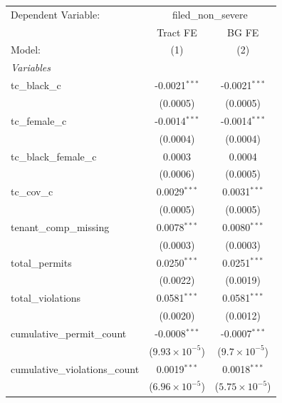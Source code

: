 \begin{tabular}{lcc}
   \tabularnewline \midrule \midrule
   Dependent Variable: & \multicolumn{2}{c}{filed\_non\_severe}\\
                                   & Tract FE                & BG FE \\   
   Model:                          & (1)                     & (2)\\  
   \midrule
   \emph{Variables}\\
   tc\_black\_c                    & -0.0021$^{***}$         & -0.0021$^{***}$\\   
                                   & (0.0005)                & (0.0005)\\   
   tc\_female\_c                   & -0.0014$^{***}$         & -0.0014$^{***}$\\   
                                   & (0.0004)                & (0.0004)\\   
   tc\_black\_female\_c            & 0.0003                  & 0.0004\\   
                                   & (0.0006)                & (0.0005)\\   
   tc\_cov\_c                      & 0.0029$^{***}$          & 0.0031$^{***}$\\   
                                   & (0.0005)                & (0.0005)\\   
   tenant\_comp\_missing           & 0.0078$^{***}$          & 0.0080$^{***}$\\   
                                   & (0.0003)                & (0.0003)\\   
   total\_permits                  & 0.0250$^{***}$          & 0.0251$^{***}$\\   
                                   & (0.0022)                & (0.0019)\\   
   total\_violations               & 0.0581$^{***}$          & 0.0581$^{***}$\\   
                                   & (0.0020)                & (0.0012)\\   
   cumulative\_permit\_count       & -0.0008$^{***}$         & -0.0007$^{***}$\\   
                                   & ($9.93\times 10^{-5}$)  & ($9.7\times 10^{-5}$)\\    
   cumulative\_violations\_count   & 0.0019$^{***}$          & 0.0018$^{***}$\\   
                                   & ($6.96\times 10^{-5}$)  & ($5.75\times 10^{-5}$)\\    

\end{tabular}
